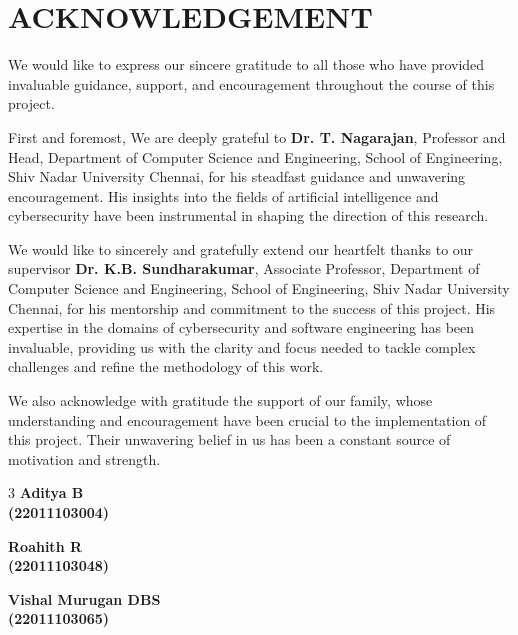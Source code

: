 \documentclass[a4paper, 12pt]{extreport}
\begin{document}
\setcounter{page}{1}




\chapter*{\LARGE ACKNOWLEDGEMENT}
\justify\doublespacing
We would like to express our sincere gratitude to all those who have provided invaluable guidance, support, and encouragement throughout the course of this project.

First and foremost, We are deeply grateful to \textbf{Dr. T. Nagarajan}, Professor and Head, Department of Computer Science and Engineering, School of Engineering, Shiv Nadar University Chennai, for his steadfast guidance and unwavering encouragement. His insights into the fields of artificial intelligence and cybersecurity have been instrumental in shaping the direction of this research.

\indent We would like to sincerely and gratefully extend our heartfelt thanks to our supervisor \newline
\textbf{Dr. K.B. Sundharakumar}, Associate Professor, Department of Computer Science and Engineering, School of Engineering, Shiv Nadar University Chennai, for his mentorship and commitment to the success of this project. His expertise in the domains of cybersecurity and software engineering has been invaluable, providing us with the clarity and focus needed to tackle complex challenges and refine the methodology of this work.

We also acknowledge with gratitude the support of our family, whose understanding and encouragement have been crucial to the implementation of this project. Their unwavering belief in us has been a constant source of motivation and strength.

\vspace{1.0cm}
\begin{multicols}{3}
\centering
\textbf{Aditya B}\\
\textbf{(22011103004)}\\
\vspace{0.1cm}


\textbf{Roahith R}\\
\textbf{(22011103048)}\\
\vspace{0.1cm}


\textbf{Vishal Murugan DBS}\\
\textbf{(22011103065)}\\
\vspace{0.1cm}

\end{multicols}
\end{document}
